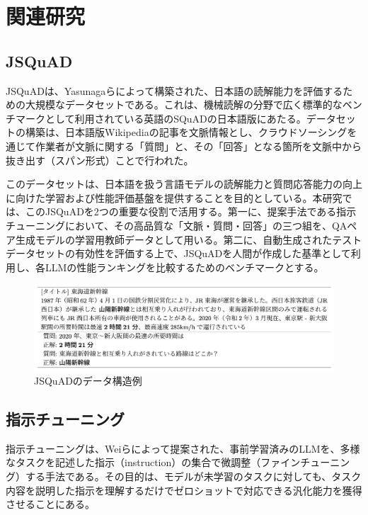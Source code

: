 \documentclass[twocolumn]{jsarticle}
\begin{document}
\section{関連研究}

\subsection{JSQuAD}
JSQuADは、Yasunagaらによって構築された\cite{JSQuAD}、日本語の読解能力を評価するための大規模なデータセットである。これは、機械読解の分野で広く標準的なベンチマークとして利用されている英語のSQuAD\cite{SQuAD}の日本語版にあたる。データセットの構築は、日本語版Wikipediaの記事を文脈情報とし、クラウドソーシングを通じて作業者が文脈に関する「質問」と、その「回答」となる箇所を文脈中から抜き出す（スパン形式）ことで行われた。

このデータセットは、日本語を扱う言語モデルの読解能力と質問応答能力の向上に向けた学習および性能評価基盤を提供することを目的としている。本研究では、このJSQuADを2つの重要な役割で活用する。第一に、提案手法である指示チューニングにおいて、その高品質な「文脈・質問・回答」の三つ組を、QAペア生成モデルの学習用教師データとして用いる。第二に、自動生成されたテストデータセットの有効性を評価する上で、JSQuADを人間が作成した基準として利用し、各LLMの性能ランキングを比較するためのベンチマークとする。

\begin{figure}[t]
  \centering
  \includegraphics[width=\linewidth]{fig/jsquad.png}
  \caption{JSQuADのデータ構造例}
  \label{fig:jsquad_example}
\end{figure}

\subsection{指示チューニング}
指示チューニングは、Weiらによって提案された\cite{Instruction-Tuning}、事前学習済みのLLMを、多様なタスクを記述した指示（instruction）の集合で微調整（ファインチューニング）する手法である。その目的は、モデルが未学習のタスクに対しても、タスク内容を説明した指示を理解するだけでゼロショットで対応できる汎化能力を獲得させることにある。
\end{document}
